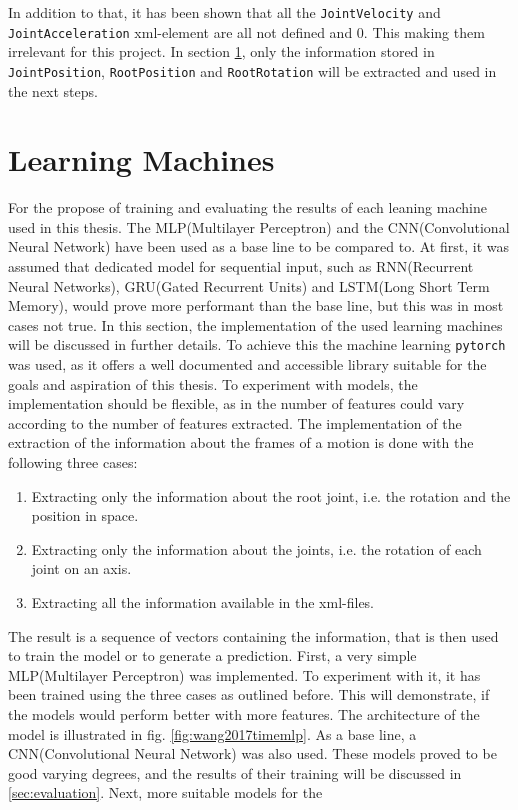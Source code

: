 In addition to that, it has been shown that all the \texttt{JointVelocity} and \texttt{JointAcceleration} xml-element are all not defined and 0. This making them irrelevant for this project. In section \ref{section:leaningmachines}, only the information stored in \texttt{JointPosition}, \texttt{RootPosition} and \texttt{RootRotation} will be extracted and used in the next steps.
\section{Learning Machines}
\label{section:leaningmachines}
For the propose of training and evaluating the results of each leaning machine used in this thesis. The MLP(Multilayer Perceptron) and the CNN(Convolutional Neural Network) have been used as a base line to be compared to. At first, it was assumed that dedicated model for sequential input, such as RNN(Recurrent Neural Networks), GRU(Gated Recurrent Units) and LSTM(Long Short Term Memory), would prove more performant than the base line, but this was in most cases not true. In this section, the implementation of the used learning machines will be discussed in further details. To achieve this the machine learning \texttt{pytorch} was used, as it offers a well documented and accessible library suitable for the goals and aspiration of this thesis. To experiment with models, the implementation should be flexible, as in the number of features could vary according to the number of features extracted. The implementation of the extraction of the information about the frames of a motion is done with the following three cases:
\begin{enumerate}
	\item Extracting only the information about the root joint, i.e. the rotation and the position in space.
	\item Extracting only the information about the joints, i.e. the rotation of each joint on an axis.
	\item Extracting all the information available in the xml-files.
\end{enumerate}
The result is a sequence of vectors containing the information, that is then used to train the model or to generate a prediction.\newline
First, a very simple MLP(Multilayer Perceptron) was implemented. To experiment with it, it has been trained using the three cases as outlined before. This will demonstrate, if the models would perform better with more features. The architecture of the model is illustrated in fig. \ref{fig:wang2017timemlp}. As a base line, a CNN(Convolutional Neural Network) was also used. These models proved to be good varying degrees, and the results of their training will be discussed in \ref{sec:evaluation}. Next, more suitable models for the 
